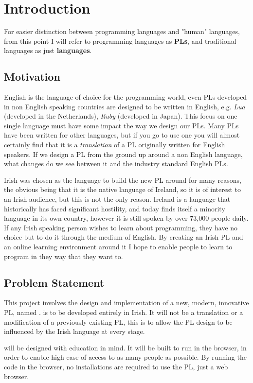 \chapter{Introduction}
For easier distinction between programming languages and "human" languages, from this point I will refer to programming languages as \textbf{PLs}, and traditional languages as just \textbf{languages}.

\section{Motivation}
English is the language of choice for the programming world, even PLs developed in non English speaking countries are designed to be written in English, e.g. \emph{Lua} (developed in the Netherlands), \emph{Ruby} (developed in Japan). This focus on one single language must have some impact the way we design our PLs. Many PLs have been written for other languages, but if you go to use one you will almost certainly find that it is a \emph{translation} of a PL originally written for English speakers\cite{wikipllist}. If we design a PL from the ground up around a non English language, what changes do we see between it and the industry standard English PLs.

Irish was chosen as the language to build the new PL around for many reasons, the obvious being that it is the native language of Ireland, so it is of interest to an Irish audience, but this is not the only reason. Ireland is a language that historically has faced significant hostility, and today finds itself a minority language in its own country, however it is still spoken by over 73,000 people daily\cite{csoirish}. If any Irish speaking person wishes to learn about programming, they have no choice but to do it through the medium of English. By creating an Irish PL and an online learning environment around it I hope to enable people to learn to program in they way that they want to.

\section{Problem Statement}
This project involves the design and implementation of a new, modern, innovative PL, named \Setanta{}. \Setanta{} is to be developed entirely in Irish. It will not be a translation or a modification of a previously existing PL, this is to allow the PL design to be influenced by the Irish language at every stage.

\Setanta{} will be designed with education in mind. It will be built to run in the browser, in order to enable high ease of access to as many people as possible. By running the code in the browser, no installations are required to use the PL, just a web browser.

